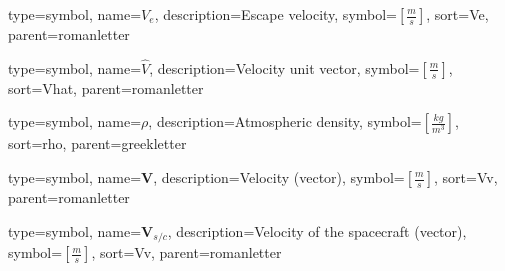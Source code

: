 {
type=symbol, %
name={\ensuremath{V_e}}, %
description={Escape velocity}, %
symbol={$\left[\frac{m}{s}\right]$}, %
sort=Ve, %
parent=romanletter %
}

{
	type=symbol, %
	name={\ensuremath{\hat{V}}}, %
	description={Velocity unit vector}, %
	symbol={$\left[\frac{m}{s}\right]$}, %
	sort=Vhat, %
	parent=romanletter %
}

{
type=symbol, %
name={\ensuremath{\rho}}, %
description={Atmospheric density}, %
symbol={$\left[\frac{kg}{m^3}\right]$}, %
sort=rho, %
parent=greekletter %
}

{
type=symbol, %
name={\ensuremath{\mathbf{V}}}, %
description={Velocity (vector)}, %
symbol={$\left[\frac{m}{s}\right]$}, %
sort=Vv, %
parent=romanletter %
}

{
type=symbol, %
name={\ensuremath{ \mathbf{V}_{s/c} }}, %
description={Velocity of the spacecraft (vector)}, %
symbol={$\left[\frac{m}{s}\right]$}, %
sort=Vv, %
parent=romanletter %
}

